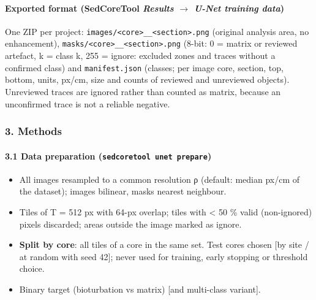 \documentclass[
  10pt,
]{article}
\providecommand{\tightlist}{%
  \setlength{\itemsep}{0pt}\setlength{\parskip}{0pt}}
\begin{document}
\hypertarget{exported-format-sedcoretool-results-u-net-training-data}{%
\paragraph{\texorpdfstring{Exported format (SedCoreTool \emph{Results $\rightarrow$
U-Net training
data})}{Exported format (SedCoreTool Results $\rightarrow$ U-Net training data)}}\label{exported-format-sedcoretool-results-u-net-training-data}}

One ZIP per project:
\texttt{images/\textless{}core\textgreater{}\_\_\textless{}section\textgreater{}.png}
(original analysis area, no enhancement),
\texttt{masks/\textless{}core\textgreater{}\_\_\textless{}section\textgreater{}.png}
(8-bit: 0 = matrix or reviewed artefact, k = class k, 255 = ignore:
excluded zones and traces without a confirmed class) and
\texttt{manifest.json} (classes; per image core, section, top, bottom,
units, px/cm, size and counts of reviewed and unreviewed objects).
Unreviewed traces are ignored rather than counted as matrix, because an
unconfirmed trace is not a reliable negative.

\hypertarget{methods}{%
\subsubsection{3. Methods}\label{methods}}

\hypertarget{data-preparation-sedcoretool-unet-prepare}{%
\paragraph{\texorpdfstring{3.1 Data preparation
(\texttt{sedcoretool\ unet\ prepare})}{3.1 Data preparation (sedcoretool unet prepare)}}\label{data-preparation-sedcoretool-unet-prepare}}

\begin{itemize}
\tightlist
\item
  All images resampled to a common resolution ρ (default: median px/cm
  of the dataset); images bilinear, masks nearest neighbour.
\item
  Tiles of T = 512 px with 64-px overlap; tiles with \textless{} 50 \%
  valid (non-ignored) pixels discarded; areas outside the image marked
  as ignore.
\item
  \textbf{Split by core}: all tiles of a core in the same set. Test
  cores chosen {[}by site / at random with seed 42{]}; never used for
  training, early stopping or threshold choice.
\item
  Binary target (bioturbation vs matrix) {[}and multi-class variant{]}.
\end{itemize}
\end{document}
